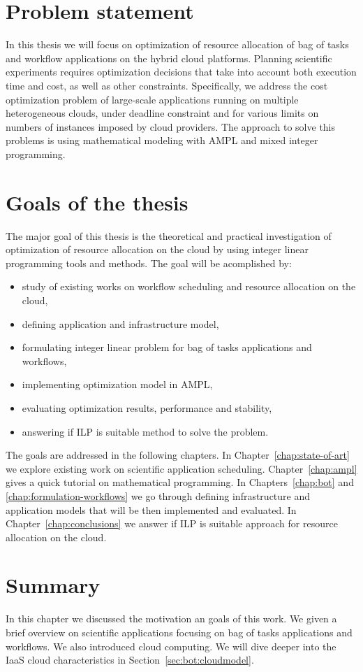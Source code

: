 \section{Problem statement}
\label{intro:statement}

In this thesis we will focus on optimization of resource allocation of bag of tasks and workflow applications on the hybrid cloud platforms. Planning scientific experiments requires optimization decisions that take into account both execution time and cost, as well as other constraints. Specifically, we address the cost optimization problem of large-scale applications running on multiple heterogeneous clouds, under deadline constraint and for various limits on numbers of instances imposed by cloud providers. The approach to solve this problems is using mathematical modeling with AMPL and mixed integer programming.


\section{Goals of the thesis}
\label{intro:goals}

The major goal of this thesis is the theoretical and practical investigation of optimization of resource allocation on the cloud by using integer linear programming tools and methods. The goal will be acomplished by:

\begin{itemize}
  \item study of existing works on workflow scheduling and resource allocation on the cloud,
  \item defining application and infrastructure model,
  \item formulating integer linear problem for bag of tasks applications and workflows,
  \item implementing optimization model in AMPL,
  \item evaluating optimization results, performance and stability,
  \item answering if ILP is suitable method to solve the problem.
\end{itemize}

The goals are addressed in the following chapters. In Chapter~\ref{chap:state-of-art} we explore existing work on scientific application scheduling. Chapter~\ref{chap:ampl} gives a quick tutorial on mathematical programming. In Chapters~\ref{chap:bot} and \ref{chap:formulation-workflows} we go through defining infrastructure and application models that will be then implemented and evaluated. In Chapter~\ref{chap:conclusions} we answer if ILP is suitable approach for resource allocation on the cloud.
 
\section{Summary}

In this chapter we discussed the motivation an goals of this work. We given a brief overview on scientific applications focusing on bag of tasks applications and workflows. We also introduced cloud computing. We will dive deeper into the IaaS cloud characteristics in Section~\ref{sec:bot:cloudmodel}.

